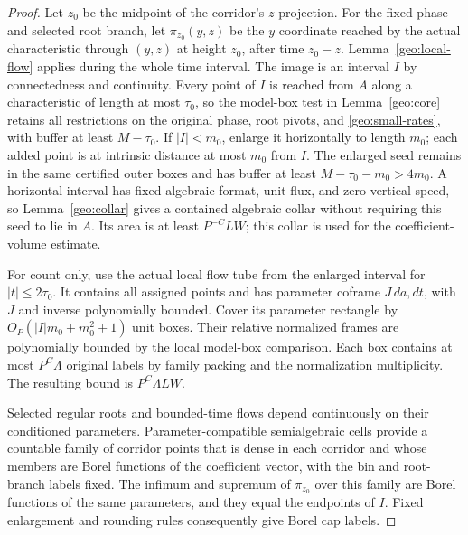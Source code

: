\documentclass[11pt]{amsart}
\theoremstyle{definition}
\theoremstyle{remark}
\numberwithin{equation}{section}
\begin{document}
\begin{proof}
Let $z_0$ be the midpoint of the corridor's $z$ projection. For the fixed phase and selected root branch, let $\pi_{z_0}(y,z)$ be the $y$ coordinate reached by the actual characteristic through $(y,z)$ at height $z_0$, after time $z_0-z$. Lemma~\ref{geo:local-flow} applies during the whole time interval. The image is an interval $I$ by connectedness and continuity. Every point of $I$ is reached from $A$ along a characteristic of length at most $\tau_0$, so the model-box test in Lemma~\ref{geo:core} retains all restrictions on the original phase, root pivots, and \eqref{geo:small-rates}, with buffer at least $M-\tau_0$. If $|I|<m_0$, enlarge it horizontally to length $m_0$; each added point is at intrinsic distance at most $m_0$ from $I$. The enlarged seed remains in the same certified outer boxes and has buffer at least $M-\tau_0-m_0>4m_0$. A horizontal interval has fixed algebraic format, unit flux, and zero vertical speed, so Lemma~\ref{geo:collar} gives a contained algebraic collar without requiring this seed to lie in $A$. Its area is at least $P^{-C}LW$; this collar is used for the coefficient-volume estimate.

For count only, use the actual local flow tube from the enlarged interval for $|t|\le2\tau_0$. It contains all assigned points and has parameter coframe $J\,da,dt$, with $J$ and inverse polynomially bounded. Cover its parameter rectangle by $O_P(|I|m_0+m_0^2+1)$ unit boxes. Their relative normalized frames are polynomially bounded by the local model-box comparison. Each box contains at most $P^C\Lambda$ original labels by family packing and the normalization multiplicity. The resulting bound is $P^C\Lambda LW$.

Selected regular roots and bounded-time flows depend continuously on their conditioned parameters. Parameter-compatible semialgebraic cells provide a countable family of corridor points that is dense in each corridor and whose members are Borel functions of the coefficient vector, with the bin and root-branch labels fixed. The infimum and supremum of $\pi_{z_0}$ over this family are Borel functions of the same parameters, and they equal the endpoints of $I$. Fixed enlargement and rounding rules consequently give Borel cap labels. 
\end{proof}
\end{document}
